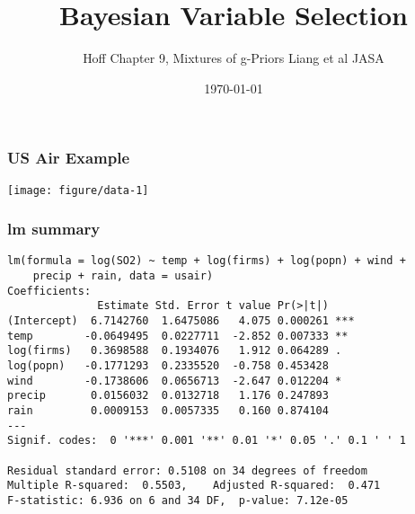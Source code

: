 \documentclass[handout]{beamer}\usepackage[]{graphicx}\usepackage[]{color}
\title{Bayesian Variable Selection}
\author{Hoff Chapter 9,  Mixtures of g-Priors Liang et al JASA}
\date{\today}
\makeatletter
\def\maxwidth{ %
  \ifdim\Gin@nat@width>\linewidth
    \linewidth
  \else
    \Gin@nat@width
  \fi
}
\newenvironment{kframe}{%
 \def\at@end@of@kframe{}%
 \ifinner\ifhmode%
  \def\at@end@of@kframe{\end{minipage}}%
  \begin{minipage}{\columnwidth}%
 \fi\fi%
 \def\FrameCommand##1{\hskip\@totalleftmargin \hskip-\fboxsep
 \colorbox{shadecolor}{##1}\hskip-\fboxsep
     \hskip-\linewidth \hskip-\@totalleftmargin \hskip\columnwidth}%
 \MakeFramed {\advance\hsize-\width
   \@totalleftmargin\z@ \linewidth\hsize
   \@setminipage}}%
 {\par\unskip\endMakeFramed%
 \at@end@of@kframe}
\newenvironment{knitrout}{}{} %
\makeatother
\begin{document}
\maketitle
\begin{frame}[fragile]  \frametitle{US Air Example}

\begin{knitrout}
\color{fgcolor}

{\centering \texttt{[image: figure/data-1]} 

}



\end{knitrout}

\end{frame}

\begin{frame}[fragile] \frametitle{lm summary}
\begin{knitrout}
\color{fgcolor}\begin{kframe}
\begin{verbatim}
lm(formula = log(SO2) ~ temp + log(firms) + log(popn) + wind +  
    precip + rain, data = usair) 
Coefficients: 
              Estimate Std. Error t value Pr(>|t|)     
(Intercept)  6.7142760  1.6475086   4.075 0.000261 *** 
temp        -0.0649495  0.0227711  -2.852 0.007333 **  
log(firms)   0.3698588  0.1934076   1.912 0.064289 .   
log(popn)   -0.1771293  0.2335520  -0.758 0.453428     
wind        -0.1738606  0.0656713  -2.647 0.012204 *   
precip       0.0156032  0.0132718   1.176 0.247893     
rain         0.0009153  0.0057335   0.160 0.874104     
--- 
Signif. codes:  0 '***' 0.001 '**' 0.01 '*' 0.05 '.' 0.1 ' ' 1 
 
Residual standard error: 0.5108 on 34 degrees of freedom 
Multiple R-squared:  0.5503,	Adjusted R-squared:  0.471  
F-statistic: 6.936 on 6 and 34 DF,  p-value: 7.12e-05 
 
\end{verbatim}
\end{kframe}
\end{knitrout}

\end{frame}
\end{document}
